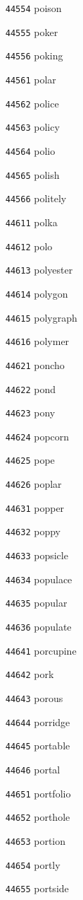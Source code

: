 \documentclass[twoside,11pt]{article}
\begin{document}
\begin{multicols}{5}
\begin{enumerate}
\item[\texttt{44554}] poison
\item[\texttt{44555}] poker
\item[\texttt{44556}] poking
\item[\texttt{44561}] polar
\item[\texttt{44562}] police
\item[\texttt{44563}] policy
\item[\texttt{44564}] polio
\item[\texttt{44565}] polish
\item[\texttt{44566}] politely
\item[\texttt{44611}] polka
\item[\texttt{44612}] polo
\item[\texttt{44613}] polyester
\item[\texttt{44614}] polygon
\item[\texttt{44615}] polygraph
\item[\texttt{44616}] polymer
\item[\texttt{44621}] poncho
\item[\texttt{44622}] pond
\item[\texttt{44623}] pony
\item[\texttt{44624}] popcorn
\item[\texttt{44625}] pope
\item[\texttt{44626}] poplar
\item[\texttt{44631}] popper
\item[\texttt{44632}] poppy
\item[\texttt{44633}] popsicle
\item[\texttt{44634}] populace
\item[\texttt{44635}] popular
\item[\texttt{44636}] populate
\item[\texttt{44641}] porcupine
\item[\texttt{44642}] pork
\item[\texttt{44643}] porous
\item[\texttt{44644}] porridge
\item[\texttt{44645}] portable
\item[\texttt{44646}] portal
\item[\texttt{44651}] portfolio
\item[\texttt{44652}] porthole
\item[\texttt{44653}] portion
\item[\texttt{44654}] portly
\item[\texttt{44655}] portside

\end{enumerate}
\end{multicols}
\end{document}
